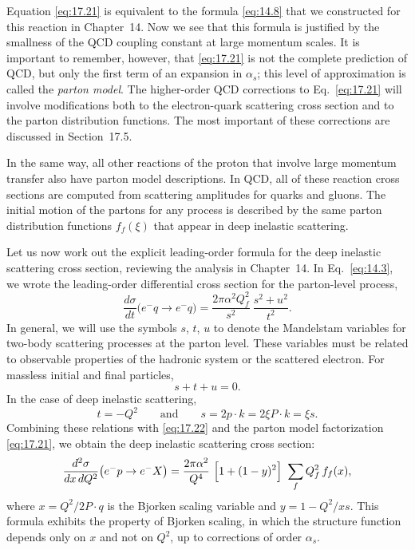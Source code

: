Equation \eqref{eq:17.21} is equivalent to the formula \eqref{eq:14.8} that
we constructed for this reaction in Chapter~14.  Now we see that this formula
is justified by the smallness of the QCD coupling constant at large momentum
scales.  It is important to remember, however, that \eqref{eq:17.21} is not
the complete prediction of QCD, but only the first term of an expansion in
$\alpha_s$; this level of approximation is called the \emph{parton model}.
The higher-order QCD corrections to Eq.~\eqref{eq:17.21} will involve
modifications both to the electron-quark scattering cross section and to the
parton distribution functions.  The most important of these corrections are
discussed in Section~17.5.

In the same way, all other reactions of the proton that involve large momentum
transfer also have parton model descriptions.  In QCD, all of these reaction
cross sections are computed from scattering amplitudes for quarks and gluons.
The initial motion of the partons for any process is described by the same
parton distribution functions $f_f(\xi)$ that appear in deep inelastic
scattering.

Let us now work out the explicit leading-order formula for the deep inelastic
scattering cross section, reviewing the analysis in Chapter~14.  In
Eq.~\eqref{eq:14.3}, we wrote the leading-order differential cross section
for the parton-level process,
\begin{equation}
  \frac{d\sigma}{dt}\bigl( e^{-}q \to e^{-}q \bigr)
  = \frac{2\pi\alpha^2 Q_f^2}{s^2}\ \frac{s^2 + u^2}{t^2} .
  \label{eq:17.22}
\end{equation}
In general, we will use the symbols $s$, $t$, $u$ to denote the Mandelstam
variables for two-body scattering processes at the parton level.  These
variables must be related to observable properties of the hadronic system or
the scattered electron.  For massless initial and final particles,
\begin{equation}
  s + t + u = 0 .
\end{equation}
In the case of deep inelastic scattering,
\begin{equation}
  t = -Q^2
  \qquad\text{and}\qquad
  s = 2p\cdot k = 2\xi P\cdot k = \xi s .
\end{equation}
Combining these relations with \eqref{eq:17.22} and the parton model
factorization \eqref{eq:17.21}, we obtain the deep inelastic scattering cross
section:
\begin{equation}
  \frac{d^2\sigma}{dx\,dQ^2}\bigl( e^{-}p \to e^{-}X \bigr)
  = \frac{2\pi\alpha^2}{Q^4}\ \Bigl[ 1 + (1-y)^2 \Bigr]\ \sum_f Q_f^2\,
    f_f(x) ,
  \label{eq:17.30}
\end{equation}
where $x = Q^2/2P\cdot q$ is the Bjorken scaling variable and
$y = 1 - Q^2/xs$.  This formula exhibits the property of Bjorken scaling, in
which the structure function depends only on $x$ and not on $Q^2$, up to
corrections of order $\alpha_s$.

